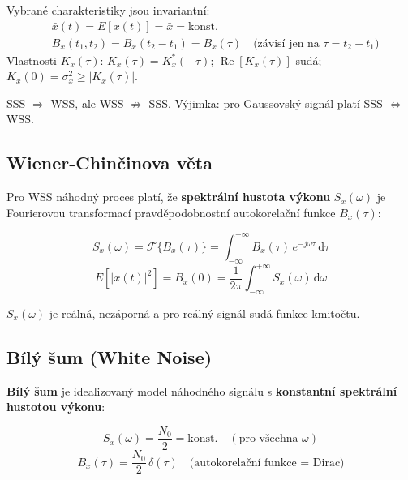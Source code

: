 \documentclass[12pt,a4paper]{article}
\newcommand{\FT}{\mathcal{F}}
\newcommand{\dd}{\mathrm{d}}
\begin{document}
\begin{infoBox}
Vybrané charakteristiky jsou invariantní:
\begin{align*}
  &\bar{x}(t) = E[x(t)] = \bar{x} = \text{konst.}\\
  &B_x(t_1, t_2) = B_x(t_2 - t_1) = B_x(\tau) \quad \text{(závisí jen na $\tau = t_2 - t_1$)}
\end{align*}
Vlastnosti $K_x(\tau)$: $K_x(\tau) = K_x^*(-\tau)$; $\operatorname{Re}[K_x(\tau)]$ sudá; $K_x(0) = \sigma_x^2 \geq |K_x(\tau)|$.
\end{infoBox}

SSS $\Rightarrow$ WSS, ale WSS $\not\Rightarrow$ SSS. Výjimka: pro Gaussovský signál platí SSS $\Leftrightarrow$ WSS.

\subsection*{Wiener-Chinčinova věta}

Pro WSS náhodný proces platí, že \textbf{spektrální hustota výkonu} $S_x(\omega)$ je Fourierovou transformací pravděpodobnostní autokorelační funkce $B_x(\tau)$:

\begin{matBox}
\[
  S_x(\omega) = \FT\{B_x(\tau)\} = \int_{-\infty}^{+\infty} B_x(\tau)\, e^{-j\omega\tau}\,\dd\tau
\]
\[
  E\!\left[|x(t)|^2\right] = B_x(0) = \frac{1}{2\pi}\int_{-\infty}^{+\infty} S_x(\omega)\,\dd\omega
\]
\end{matBox}

$S_x(\omega)$ je reálná, nezáporná a pro reálný signál sudá funkce kmitočtu.

\begin{hvezdBox}
\subsection*{Bílý šum (White Noise)}
\end{hvezdBox}

\textbf{Bílý šum} je idealizovaný model náhodného signálu s \textbf{konstantní spektrální hustotou výkonu}:

\begin{matBox}
\[
  S_x(\omega) = \frac{N_0}{2} = \text{konst.} \quad (\text{pro všechna }\omega)
\]
\[
  B_x(\tau) = \frac{N_0}{2}\,\delta(\tau) \quad \text{(autokorelační funkce = Dirac)}
\]
\end{matBox}
\end{document}
